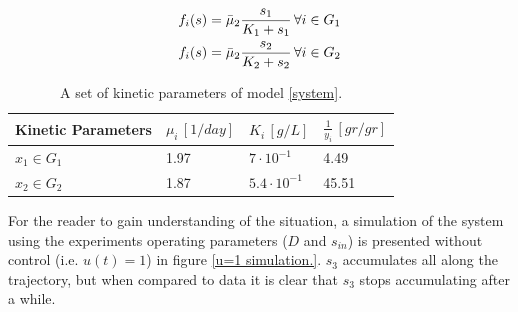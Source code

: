 \documentclass[3p,times]{article}
\begin{document}
\begin{align}
\label{monod} f_i(s) &= \bar{\mu}_2 \dfrac{s_1}{K_1 +s_1} \, \forall i \in G_1 \\
\notag  f_i(s) &= \bar{\mu}_2 \dfrac{s_2}{K_2 +s_2 } \, \forall i \in G_2
\end{align}

\begin{table}[ht]
	\centering
	\begin{tabular}{|l|l|l|l|}
		\hline
		Kinetic Parameters & $\mu_i\,[1/day]$ & $K_i\,[g/L]$ & $\frac{1}{y_i} \, [gr/gr]$ \\ \hline
		$x_1 \in G_1$ & 1.97  & $7\cdot 10^{-1}$ & 4.49  \\ \hline
		$x_2\in G_2$ & 1.87 & $5.4\cdot 10^{-1}$ &  45.51 \\ \hline
	\end{tabular}	
	\caption{A set of kinetic parameters of model \eqref{system}.}
	\label{kinetic_parameters_application}
\end{table}
For the reader to gain understanding of the situation, a simulation of the system using the experiments operating parameters ($D$ and $s_{in}$) is presented without control (i.e. $u(t)= 1$) in  figure \ref{u=1 simulation.}. $s_3$ accumulates all along the trajectory, but when compared to data it is clear that $s_3$ stops accumulating after a while. 
\end{document}
